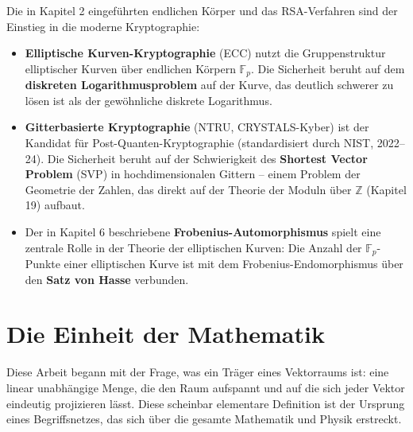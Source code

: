 ﻿\documentclass[a4paper,12pt]{report}
\theoremstyle{definition}
\begin{document}
Die in Kapitel 2 eingeführten endlichen Körper und das
RSA-Verfahren sind der Einstieg in die moderne Kryptographie:
\begin{itemize}
    \item[-] \textbf{Elliptische Kurven-Kryptographie} (ECC)
          nutzt die Gruppenstruktur elliptischer Kurven über
          endlichen Körpern $\mathbb{F}_p$. Die Sicherheit beruht
          auf dem \textbf{diskreten Logarithmusproblem} auf der
          Kurve, das deutlich schwerer zu lösen ist als der
          gewöhnliche diskrete Logarithmus.
    \item[-] \textbf{Gitterbasierte Kryptographie} (NTRU, CRYSTALS-Kyber)
          ist der Kandidat für Post-Quanten-Kryptographie
          (standardisiert durch NIST, 2022--24). Die Sicherheit
          beruht auf der Schwierigkeit des \textbf{Shortest
          Vector Problem} (SVP) in hochdimensionalen Gittern --
          einem Problem der Geometrie der Zahlen, das direkt
          auf der Theorie der Moduln über $\mathbb{Z}$
          (Kapitel 19) aufbaut.
    \item[-] Der in Kapitel 6 beschriebene
          \textbf{Frobenius-Automorphismus} spielt eine
          zentrale Rolle in der Theorie der
          elliptischen Kurven: Die Anzahl der $\mathbb{F}_p$-Punkte
          einer elliptischen Kurve ist mit dem Frobenius-Endomorphismus
          über den \textbf{Satz von Hasse} verbunden.
\end{itemize}

\section{Die Einheit der Mathematik}

Diese Arbeit begann mit der Frage, was ein Träger eines Vektorraums ist: eine linear
unabhängige Menge, die den Raum aufspannt und auf die sich
jeder Vektor eindeutig projizieren lässt. Diese scheinbar
elementare Definition ist der Ursprung eines Begriffsnetzes,
das sich über die gesamte Mathematik und Physik erstreckt.
\end{document}

